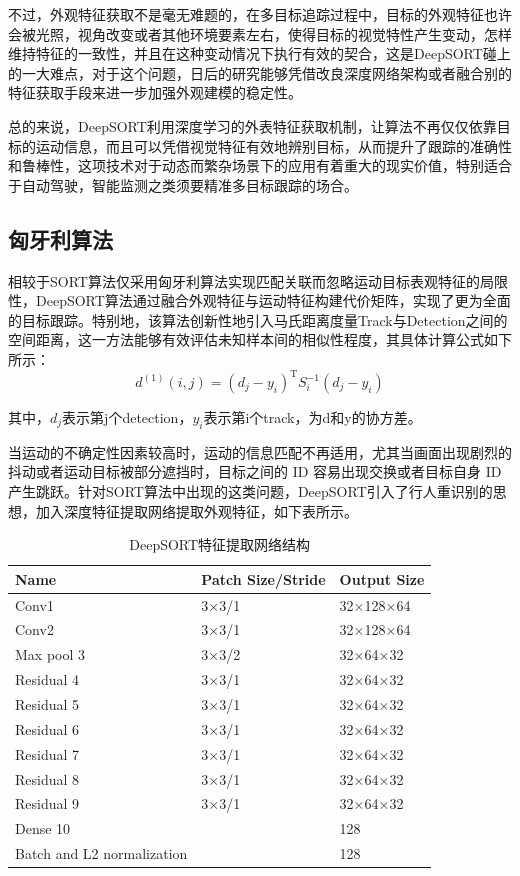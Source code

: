 不过，外观特征获取不是毫无难题的，在多目标追踪过程中，目标的外观特征也许会被光照，视角改变或者其他环境要素左右，使得目标的视觉特性产生变动，怎样维持特征的一致性，并且在这种变动情况下执行有效的契合，这是DeepSORT碰上的一大难点，对于这个问题，日后的研究能够凭借改良深度网络架构或者融合别的特征获取手段来进一步加强外观建模的稳定性。

总的来说，DeepSORT利用深度学习的外表特征获取机制，让算法不再仅仅依靠目标的运动信息，而且可以凭借视觉特征有效地辨别目标，从而提升了跟踪的准确性和鲁棒性，这项技术对于动态而繁杂场景下的应用有着重大的现实价值，特别适合于自动驾驶，智能监测之类须要精准多目标跟踪的场合。


\subsection{匈牙利算法}

相较于SORT算法仅采用匈牙利算法实现匹配关联而忽略运动目标表观特征的局限性，DeepSORT算法通过融合外观特征与运动特征构建代价矩阵，实现了更为全面的目标跟踪。特别地，该算法创新性地引入马氏距离度量Track与Detection之间的空间距离，这一方法能够有效评估未知样本间的相似性程度，其具体计算公式如下所示：
\begin{equation}
	d^{(1)}(i, j) = (d_j - y_i)^\mathrm{T} S_i^{-1} (d_j - y_i)
\end{equation}

其中，\(d_j\)表示第j个detection，\(y_i\)表示第i个track，为d和y的协方差。

当运动的不确定性因素较高时，运动的信息匹配不再适用，尤其当画面出现剧烈的抖动或者运动目标被部分遮挡时，目标之间的 ID 容易出现交换或者目标自身 ID 产生跳跃。针对SORT算法中出现的这类问题，DeepSORT引入了行人重识别的思想，加入深度特征提取网络提取外观特征，如下表所示。

\begin{table}[htbp]
	\caption{DeepSORT特征提取网络结构 }
	\label{tab:software_stack}
	\centering
	\begin{tabular}{lll}
		\toprule
		Name & Patch Size/Stride & Output Size \\
		\midrule
		Conv1 & 3×3/1 & 32×128×64 \\
		Conv2 & 3×3/1 & 32×128×64 \\
		Max pool 3 & 3×3/2 & 32×64×32 \\
		Residual 4 & 3×3/1 & 32×64×32 \\
		Residual 5 & 3×3/1 & 32×64×32 \\
		Residual 6 & 3×3/1 & 32×64×32 \\
		Residual 7 & 3×3/1 & 32×64×32 \\
		Residual 8 & 3×3/1 & 32×64×32 \\
		Residual 9 & 3×3/1 & 32×64×32 \\
		Dense 10 &   & 128 \\
		Batch and L2 normalization &   & 128 \\
		\bottomrule
	\end{tabular}
\end{table}

